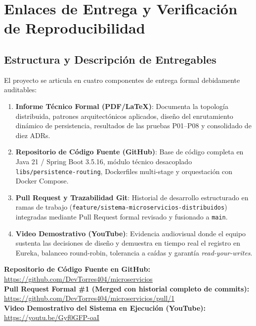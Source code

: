 \documentclass[12pt,a4paper]{article}
\begin{document}
\clearpage
\section{Enlaces de Entrega y Verificaci\'{o}n de Reproducibilidad}

\subsection{Estructura y Descripci\'{o}n de Entregables}
El proyecto se articula en cuatro componentes de entrega formal debidamente auditables:
\begin{enumerate}
    \item \textbf{Informe T\'{e}cnico Formal (PDF/LaTeX)}: Documenta la topolog\'{i}a distribuida, patrones arquitect\'{o}nicos aplicados, dise\~{n}o del enrutamiento din\'{a}mico de persistencia, resultados de las pruebas P01--P08 y consolidado de diez ADRs.
    \item \textbf{Repositorio de C\'{o}digo Fuente (GitHub)}: Base de c\'{o}digo completa en Java 21 / Spring Boot 3.5.16, m\'{o}dulo t\'{e}cnico desacoplado \texttt{libs/persistence-routing}, Dockerfiles multi-stage y orquestaci\'{o}n con Docker Compose.
    \item \textbf{Pull Request y Trazabilidad Git}: Historial de desarrollo estructurado en ramas de trabajo (\texttt{feature/sistema-microservicios-distribuidos}) integradas mediante Pull Request formal revisado y fusionado a \texttt{main}.
    \item \textbf{Video Demostrativo (YouTube)}: Evidencia audiovisual donde el equipo sustenta las decisiones de dise\~{n}o y demuestra en tiempo real el registro en Eureka, balanceo round-robin, tolerancia a ca\'{i}das y garant\'{i}a \textit{read-your-writes}.
\end{enumerate}

\begin{tcolorbox}[formalbox]
\textbf{Repositorio de C\'{o}digo Fuente en GitHub:}\\
\url{https://github.com/DevTorres404/microservicios}\\[0.25cm]
\textbf{Pull Request Formal \#1 (Merged con historial completo de commits):}\\
\url{https://github.com/DevTorres404/microservicios/pull/1}\\[0.25cm]
\textbf{Video Demostrativo del Sistema en Ejecuci\'{o}n (YouTube):}\\
\url{https://youtu.be/Gyf0GFP-oaI}
\end{tcolorbox}
\end{document}
